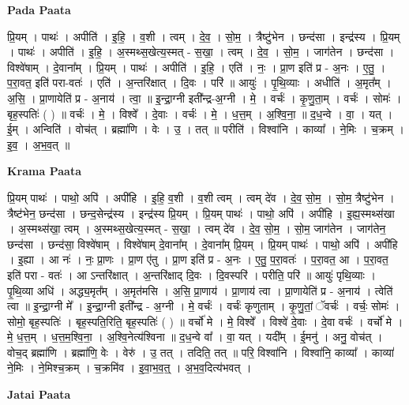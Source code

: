 \documentclass[17pt]{extarticle}
\begin{document}
\textbf{Pada Paata} \newline

प्रि॒यम् । पाथः॑ । अपीति॑ । इ॒हि॒ । व॒शी । त्वम् । दे॒व॒ । सो॒म॒ । त्रैष्टु॑भेन । छन्द॑सा । इन्द्र॑स्य । प्रि॒यम् । पाथः॑ । अपीति॑ । इ॒हि॒ । अ॒स्मथ्स॒खेत्य॒स्मत् - स॒खा॒ । त्वम् । दे॒व॒ । सो॒म॒ । जाग॑तेन । छन्द॑सा । विश्वे॑षाम् । दे॒वाना᳚म् । प्रि॒यम् । पाथः॑ । अपीति॑ । इ॒हि॒ । एति॑ । नः॒ । प्रा॒ण इति॑ प्र - अ॒नः । ए॒तु॒ । प॒रा॒वत॒ इति॑ परा-वतः॑ । एति॑ । अ॒न्तरि॑क्षात् । दि॒वः । परि॑ ॥ आयुः॑ । पृ॒थि॒व्याः । अधीति॑ । अ॒मृत᳚म् । अ॒सि॒ । प्रा॒णायेति॑ प्र - अ॒नाय॑ । त्वा॒ ॥ इ॒न्द्रा॒ग्नी इती᳚न्द्र-अ॒ग्नी । मे॒ । वर्चः॑ । कृ॒णु॒ता॒म् । वर्चः॑ । सोमः॑ । बृह॒स्पतिः॑ ( ) ॥ वर्चः॑ । मे॒ । विश्वे᳚ । दे॒वाः । वर्चः॑ । मे॒ । ध॒त्त॒म् । अ॒श्वि॒ना॒ ॥ द॒ध॒न्वे । वा॒ । यत् । ई॒म् । अन्विति॑ । वोच॑त् । ब्रह्मा॑णि । वेः । उ॒ । तत् ॥ परीति॑ । विश्वा॑नि । काव्या᳚ । ने॒मिः । च॒क्रम् । इ॒व॒ । अ॒भ॒व॒त् ॥  \newline


\textbf{Krama Paata} \newline

प्रि॒यम् पाथः॑ । पाथो॒ अपि॑ । अपी॑हि । इ॒हि॒ व॒शी । व॒शी त्वम् । त्वम् दे॑व । दे॒व॒ सो॒म॒ । सो॒म॒ त्रैष्टु॑भेन । त्रैष्ट॑भेन॒ छन्द॑सा । छन्द॒सेन्द्र॑स्य । इन्द्र॑स्य प्रि॒यम् । प्रि॒यम् पाथः॑ । पाथो॒ अपि॑ । अपी॑हि । इ॒ह्य॒स्मथ्स॑खा । अ॒स्मथ्स॑खा॒ त्वम् । अ॒स्मथ्स॒खेत्य॒स्मत् - स॒खा॒ । त्वम् दे॑व । दे॒व॒ सो॒म॒ । सो॒म॒ जाग॑तेन । जाग॑तेन॒ छन्द॑सा । छन्द॑सा॒ विश्वे॑षाम् । विश्वे॑षाम् दे॒वाना᳚म् । दे॒वाना᳚म् प्रि॒यम् । प्रि॒यम् पाथः॑ । पाथो॒ अपि॑ । अपी॑हि । इ॒ह्या । आ नः॑ । नः॒ प्रा॒णः । प्रा॒ण ए॑तु । प्रा॒ण इति॑ प्र - अ॒नः । ए॒तु॒ प॒रा॒वतः॑ । प॒रा॒वत॒ आ । प॒रा॒वत॒ इति॑ परा - वतः॑ । आ ऽन्तरि॑क्षात् । अ॒न्तरि॑क्षाद् दि॒वः । दि॒वस्परि॑ । परीति॒ परि॑ ॥ आयुः॑ पृथि॒व्याः । पृ॒थि॒व्या अधि॑ । अद्ध्य॒मृत᳚म् । अ॒मृत॑मसि । अ॒सि॒ प्रा॒णाय॑ । प्रा॒णाय॑ त्वा । प्रा॒णायेति॑ प्र - अ॒नाय॑ । त्वेति॑ त्वा ॥ इ॒न्द्रा॒ग्नी मे᳚ । इ॒न्द्रा॒ग्नी इती᳚न्द्र - अ॒ग्नी । मे॒ वर्चः॑ । वर्चः॑ कृणुताम् । कृ॒णु॒तां॒ ॅवर्चः॑ । वर्चः॒ सोमः॑ । सोमो॒ बृह॒स्पतिः॑ । बृह॒स्पति॒रिति॒ बृह॒स्पतिः॑ ( ) ॥ वर्चो॑ मे । मे॒ विश्वे᳚ । विश्वे॑ दे॒वाः । दे॒वा वर्चः॑ । वर्चो॑ मे । मे॒ ध॒त्त॒म् । ध॒त्त॒म॒श्वि॒ना॒ । अ॒श्वि॒नेत्य॑श्विना ॥ द॒ध॒न्वे वा᳚ । वा॒ यत् । यदी᳚म् । ई॒मनु॑ । अनु॒ वोच॑त् । वोच॒द् ब्रह्मा॑णि । ब्रह्मा॑णि॒ वेः । वेरु॑ । उ॒ तत् । तदिति॒ तत् ॥ परि॒ विश्वा॑नि । विश्वा॑नि॒ काव्या᳚ । काव्या॑ ने॒मिः । ने॒मिश्च॒क्रम् । च॒क्रमि॑व । इ॒वा॒भ॒व॒त्॒ । अ॒भ॒व॒दित्य॑भवत् । \newline

\textbf{Jatai Paata} \newline
\end{document}
